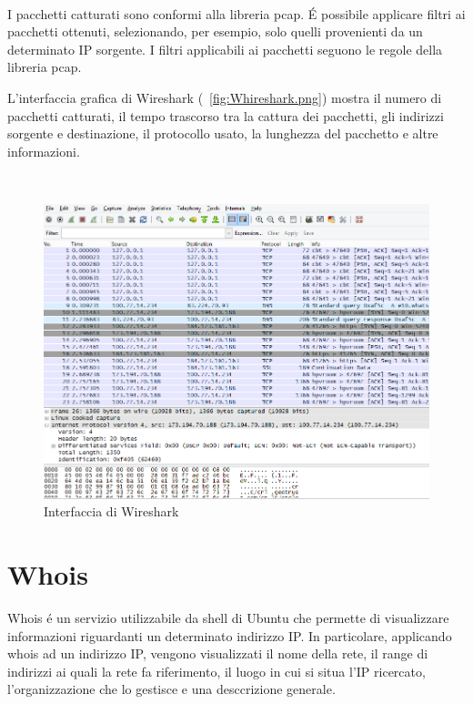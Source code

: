 \documentclass[a4paper,11pt]{book}
\begin{document}
~

I pacchetti catturati sono conformi alla libreria pcap. \'E possibile applicare filtri ai pacchetti ottenuti, selezionando, per esempio, solo quelli provenienti da un determinato IP sorgente. I filtri applicabili ai pacchetti seguono le regole della libreria pcap.

L'interfaccia grafica di Wireshark (\figurename ~\ref{fig:Whireshark.png}) mostra il numero di pacchetti catturati, il tempo trascorso tra la cattura dei pacchetti, gli indirizzi sorgente e destinazione, il protocollo usato, la lunghezza del pacchetto e altre informazioni.

~

\begin{figure}[h!t]
\centering
\includegraphics[scale = 0.5]{Whireshark.png}
\caption{Interfaccia di Wireshark}
\end{figure}

\clearpage

\section{Whois}
Whois \'e un servizio utilizzabile da shell di Ubuntu che permette di visualizzare informazioni riguardanti un determinato indirizzo IP.
In particolare, applicando whois ad un indirizzo IP, vengono visualizzati il nome della rete, il range di indirizzi ai quali la rete fa riferimento, il luogo in cui si situa l'IP ricercato, l'organizzazione che lo gestisce e una desccrizione generale.

~
\end{document}
